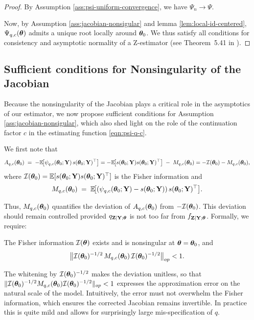 \documentclass[twoside,11pt]{article}
\begin{document}
\begin{proof}

By Assumption \eqref{ass:psi-uniform-convergence}, we have $\Psi_n \to \Psi$.

Now, by Assumption \eqref{ass:jacobian-nonsigular} and lemma \eqref{lem:local-id-centered}, $\Psi_{q,c}({\bm{\theta}})$ admits a unique root locally around ${{\bm{\theta}}_0}$.
We thus satisfy all conditions for consistency and asymptotic normality of a Z-estimator (see Theorem~5.41 in \citealp{vandervaart1998}).
\end{proof}


\subsection{Sufficient conditions for Nonsingularity of the Jacobian}

Because the nonsingularity of the Jacobian plays a critical role in the asymptotics of our estimator, 
we now propose sufficient conditions for Assumption \eqref{ass:jacobian-nonsigular}, 
which also shed light on the role of the continuation factor $c$ in the estimating function 
\eqref{eqn:psi-q-c}. 

We first note that
\[
A_{q,c}({{\bm{\theta}}_0})\;=\;-\mathbb{E}\!\big[\psi_{q,c}({{\bm{\theta}}_0};{\bf Y})\,s({{\bm{\theta}}_0};{\bf Y})^\top\big]
= -\mathbb{E}\!\big[s({{\bm{\theta}}_0};{\bf Y})s({{\bm{\theta}}_0};{\bf Y})^\top\big]\;-\;M_{q,c}({{\bm{\theta}}_0})
= -\mathcal I({{\bm{\theta}}_0}) - M_{q,c}({{\bm{\theta}}_0}),
\]
where $\mathcal I({{\bm{\theta}}_0})=\mathbb{E}[s({{\bm{\theta}}_0};{\bf Y})s({{\bm{\theta}}_0};{\bf Y})^\top]$ is the Fisher information and
\[
M_{q,c}({{\bm{\theta}}_0}) \;=\; \mathbb{E}\!\big[(\psi_{q,c}({{\bm{\theta}}_0};{\bf Y})-s({{\bm{\theta}}_0};{\bf Y}))\,s({{\bm{\theta}}_0};{\bf Y})^\top\big].
\]

Thus, $M_{q,c}({{\bm{\theta}}_0})$ quantifies the deviation of $A_{q,c}({{\bm{\theta}}_0})$ from $-\mathcal I({{\bm{\theta}}_0})$. 
This deviation should remain controlled provided $q_{{\bf Z}\mid{\bf Y};{\bm{\theta}}}$ is not too far from 
$f_{{\bf Z}\mid{\bf Y};{\bm{\theta}}}$. Formally, we require:

\begin{assumption}
The Fisher information $\mathcal{I}({\bm{\theta}})$ exists and is nonsingular at ${\bm{\theta}}={{\bm{\theta}}_0}$, and
\[
\bigl\|\mathcal{I}({{\bm{\theta}}_0})^{-1/2}\,M_{q,c}({\bm{\theta}}_0)\,\mathcal{I}({{\bm{\theta}}_0})^{-1/2}\bigr\|_{op} < 1.
\]
\label{ass:M-whitened-smaller-1}
\end{assumption}

\begin{remark}[Interpretation]
The whitening by $\mathcal{I}({{\bm{\theta}}_0})^{-1/2}$ makes the deviation unitless, so that 
$\|\mathcal{I}({{\bm{\theta}}_0})^{-1/2}M_{q,c}({\bm{\theta}}_0)\mathcal{I}({{\bm{\theta}}_0})^{-1/2}\|_{op}<1$ expresses 
the approximation error on the natural scale of the model. 
Intuitively, the error must not overwhelm the Fisher information, which ensures 
the corrected Jacobian remains invertible. 
In practice this is quite mild and allows for surprisingly large mis-specification of $q$.
\end{remark}
\end{document}

